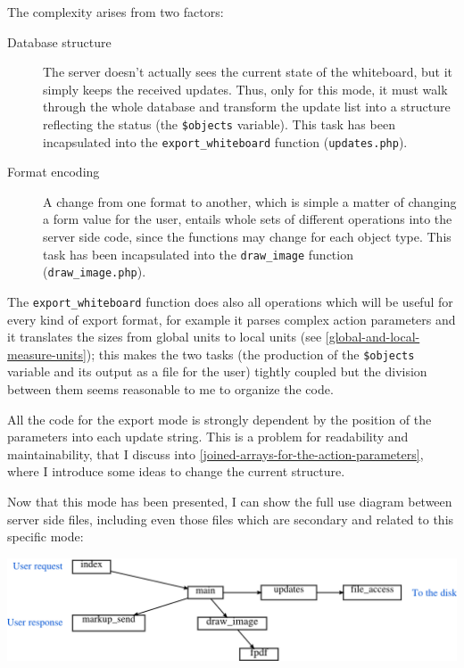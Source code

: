 \documentclass[10pt,a4paper,english]{book}
\begin{document}
The complexity arises from two factors:
\begin{description}
\item[{Database structure}] \leavevmode 
The server doesn't actually sees the current state of the
whiteboard, but it simply keeps the received updates. Thus, only
for this mode, it must walk through the whole database and
transform the update list into a structure reflecting the status
(the \texttt{{\$}objects} variable). This task has been incapsulated into
the \texttt{export{\_}whiteboard} function (\texttt{updates.php}).

\item[{Format encoding}] \leavevmode 
A change from one format to another, which is simple a matter of
changing a form value for the user, entails whole sets of
different operations into the server side code, since the functions
may change for each object type. This task has been incapsulated
into the \texttt{draw{\_}image} function (\texttt{draw{\_}image.php}).

\end{description}

The \texttt{export{\_}whiteboard} function does also all operations which will
be useful for every kind of export format, for example it parses
complex action parameters and it translates the sizes from global
units to local units (see \href{\#global-and-local-measure-units}{\ref*{global-and-local-measure-units}}); this
makes the two tasks (the production of the \texttt{{\$}objects} variable and
its output as a file for the user) tightly coupled but the division
between them seems reasonable to me to organize the code.

All the code for the export mode is strongly dependent by the position
of the parameters into each update string. This is a problem for
readability and maintainability, that I discuss into \href{\#joined-arrays-for-the-action-parameters}{\ref*{joined-arrays-for-the-action-parameters}}, where I introduce some ideas to change the
current structure.

Now that this mode has been presented, I can show the full use diagram
between server side files, including even those files which are
secondary and related to this specific mode:

\includegraphics{images/server_file_use_full.png}
\end{document}
